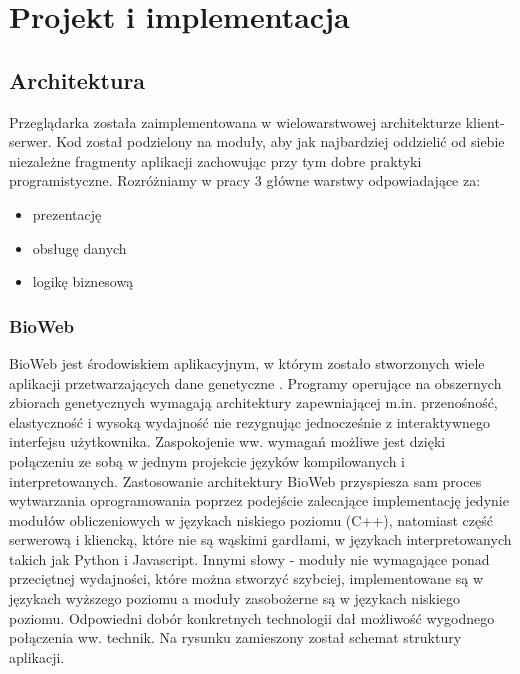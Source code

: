 \chapter{Projekt i implementacja}


\section{Architektura}

Przeglądarka została zaimplementowana w wielowarstwowej architekturze klient-serwer.
Kod został podzielony na moduły, aby jak najbardziej oddzielić od siebie niezależne fragmenty aplikacji zachowując przy tym dobre praktyki programistyczne.
Rozróżniamy w pracy 3 główne warstwy odpowiadające za:
\begin{itemize}
	\item prezentację
	\item obsługę danych
	\item logikę biznesową
\end{itemize}

\subsection*{BioWeb}

BioWeb jest środowiskiem aplikacyjnym, w którym zostało stworzonych wiele aplikacji przetwarzających dane genetyczne \cite{article:bioweb}.
Programy operujące na obszernych zbiorach genetycznych wymagają architektury zapewniającej m.in. przenośność, elastyczność i wysoką wydajność nie rezygnując jednocześnie z interaktywnego interfejsu użytkownika.
Zaspokojenie ww. wymagań możliwe jest dzięki połączeniu ze sobą w jednym projekcie języków kompilowanych i interpretowanych.
Zastosowanie architektury BioWeb przyspiesza sam proces wytwarzania oprogramowania poprzez podejście zalecające implementację jedynie modułów obliczeniowych w językach niskiego poziomu (C++), natomiast część serwerową i kliencką, które nie są wąskimi gardłami, w językach interpretowanych takich jak Python i Javascript.
Innymi słowy - moduły nie wymagające ponad przeciętnej wydajności, które można stworzyć szybciej, implementowane są w językach wyższego poziomu a moduły zasobożerne są w językach niskiego poziomu. Odpowiedni dobór konkretnych technologii dał możliwość wygodnego połączenia ww. technik.
Na rysunku \todo{[link]} zamieszony został schemat struktury aplikacji.
\\



